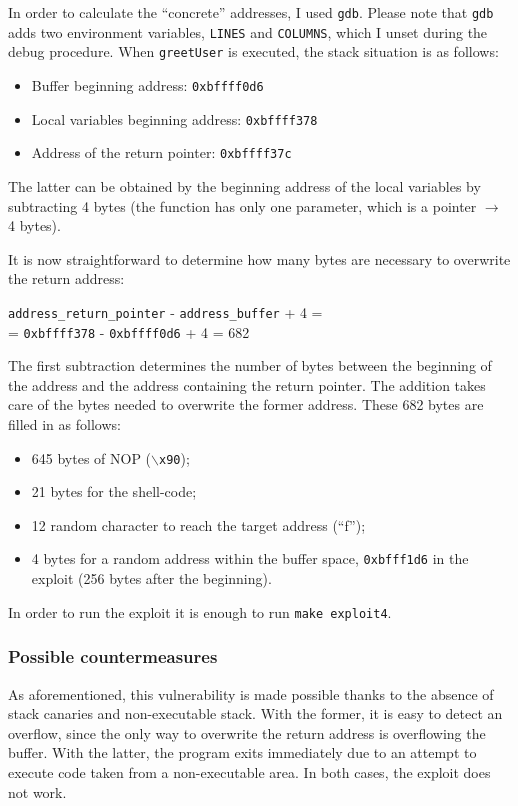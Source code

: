 In order to calculate the ``concrete'' addresses, I used \texttt{gdb}. Please note that \texttt{gdb} adds two environment variables, \texttt{LINES} and \texttt{COLUMNS}, which I unset during the debug procedure. When \texttt{greetUser} is executed, the stack situation is as follows:
\begin{itemize}
	\item Buffer beginning address: \texttt{0xbffff0d6}
	\item Local variables beginning address: \texttt{0xbffff378}
	\item Address of the return pointer: \texttt{0xbffff37c}
\end{itemize}
The latter can be obtained by the beginning address of the local variables by subtracting 4 bytes (the function has only one parameter, which is a pointer $\rightarrow$ 4 bytes).

It is now straightforward to determine how many bytes are necessary to overwrite the return address:

\begin{center}
	\texttt{address\_return\_pointer} - \texttt{address\_buffer} + 4 =\\
	= \texttt{0xbffff378} - \texttt{0xbffff0d6} + 4 = 682
\end{center}

The first subtraction determines the number of bytes between the beginning of the address and the address containing the return pointer. The addition takes care of the bytes needed to overwrite the former address. These 682 bytes are filled in as follows:
\begin{itemize}
	\item 645 bytes of NOP (\texttt{$\backslash$x90});
	\item 21 bytes for the shell-code;
	\item 12 random character to reach the target address (``f'');
	\item 4 bytes for a random address within the buffer space, \texttt{0xbfff1d6} in the exploit (256 bytes after the beginning).
\end{itemize}

In order to run the exploit it is enough to run \texttt{make exploit4}.

\subsubsection{Possible countermeasures}
As aforementioned, this vulnerability is made possible thanks to the absence of stack canaries and non-executable stack. With the former, it is easy to detect an overflow, since the only way to overwrite the return address is overflowing the buffer. With the latter, the program exits immediately due to an attempt to execute code taken from a non-executable area. In both cases, the exploit does not work. 

